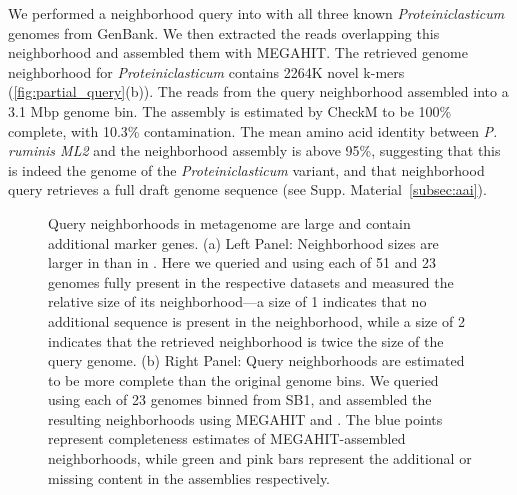 We performed a neighborhood query into \podarv with all three known {\em
  Proteiniclasticum} genomes from GenBank.  We then extracted the reads
overlapping this neighborhood and assembled them with MEGAHIT.  The
retrieved genome neighborhood for {\em Proteiniclasticum} contains
2264K novel k-mers (\autoref{fig:partial_query}(b)). The reads from
the query neighborhood assembled into a 3.1 Mbp genome bin. The
assembly is estimated by CheckM to be 100\% complete, with 10.3\%
contamination.
The mean amino acid identity between {\em P. ruminis ML2} and the
neighborhood assembly is above 95\%, suggesting that this is indeed
the genome of the {\em Proteiniclasticum} variant, and that
neighborhood query retrieves a full draft genome sequence (see Supp. Material~\ref{subsec:aai}).

\begin{figure}[th]
	\centering
    \hspace{.05\linewidth}
	\caption{Query neighborhoods in \hu metagenome are large and contain additional marker genes.
  (a) Left Panel: Neighborhood sizes are larger in \hu than in \podarv. Here
  we queried \podarv and \hu using each of 51 and 23 genomes fully present
  in the respective datasets and measured the relative size of its neighborhood—a
  size of 1 indicates that no additional sequence is present in the neighborhood,
  while a size of 2 indicates that the retrieved neighborhood is twice the size
  of the query genome.
  (b) Right Panel: Query neighborhoods are estimated to be more complete
  than the original genome bins. We queried \hu using each of 23 genomes binned
  from SB1, and assembled the resulting neighborhoods using MEGAHIT and \plass.
  The blue points represent completeness estimates of MEGAHIT-assembled
  neighborhoods, while green and pink bars represent the additional or missing
  content in the \plass assemblies respectively.
  }\label{fig:hu_strain}
\end{figure}



